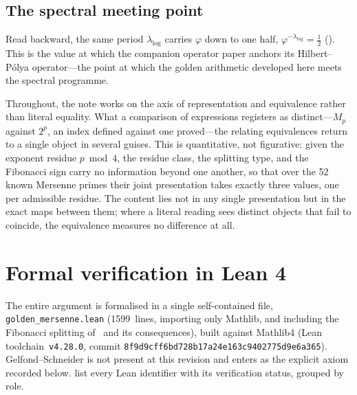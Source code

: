 \documentclass[11pt]{amsart}
\theoremstyle{definition}
\newcommand{\golden}{\varphi}
\newcommand{\Mp}{M_{p}}
\begin{document}
\subsection*{The spectral meeting point}
Read backward, the same period $\lambda_{\log}$ carries $\golden$ down to
one half, $\golden^{-\lambda_{\log}}=\tfrac12$ ().  This
is the value at which the companion operator paper anchors its
Hilbert--P\'olya operator---the point at which the golden arithmetic
developed here meets the spectral programme.

\medskip
Throughout, the note works on the axis of representation and equivalence
rather than literal equality.  What a comparison of expressions registers as
distinct---$\Mp$ against $2^{p}$, an index defined against one proved---the
relating equivalences return to a single object in several guises.  This is
quantitative, not figurative: given the exponent residue $p\bmod4$, the
residue class, the splitting type, and the Fibonacci sign carry no
information beyond one another, so that over the 52 known Mersenne primes
their joint presentation takes exactly three values, one per admissible
residue.  The content lies not in any single presentation but in the exact
maps between them; where a literal reading sees distinct objects that fail to
coincide, the equivalence measures no difference at all.

\section{Formal verification in Lean 4}

The entire argument is formalised in a single self-contained file,
\texttt{golden\_mersenne.lean} (1599~lines, importing
only Mathlib, and including the Fibonacci splitting of~
and its consequences), built against Mathlib4 (Lean toolchain~\texttt{v4.28.0}, commit
\texttt{8f9d9cff6bd728b17a24e163c9402775d9e6a365}).  Gelfond--Schneider
is not present at this revision and enters as the explicit axiom
recorded below.   list every Lean identifier
with its verification status, grouped by role.
\end{document}
